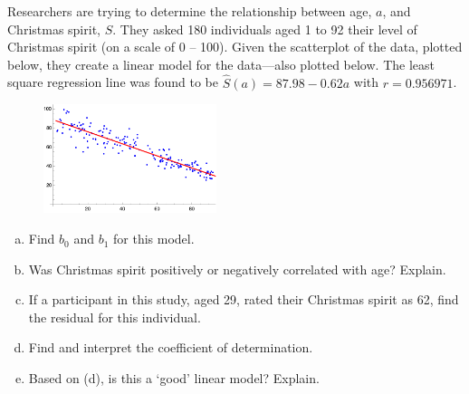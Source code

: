\documentclass[12pt,letterpaper]{exam}
\begin{document}
\begin{questions}
\newpage
\question[10] Researchers are trying to determine the relationship between age, $a$, and Christmas spirit, $S$. They asked 180 individuals aged 1 to 92 their level of Christmas spirit (on a scale of 0 -- 100). Given the scatterplot of the data, plotted below, they create a linear model for the data---also plotted below. The least square regression line was found to be $\widehat{S}(a)= 87.98 - 0.62a$ with $r= 0.956971$. \par
	\begin{figure}[h]
	\centering
	\includegraphics[width=0.45\textwidth]{xmas_spirit.png}
	\end{figure}

\begin{enumerate}[(a)]
\item Find $b_0$ and $b_1$ for this model. 
\item Was Christmas spirit positively or negatively correlated with age? Explain.
\item If a participant in this study, aged 29, rated their Christmas spirit as 62, find the residual for this individual. 
\item Find and interpret the coefficient of determination. 
\item Based on (d), is this a `good' linear model? Explain. 
\end{enumerate}
	

\end{questions}
\end{document}
